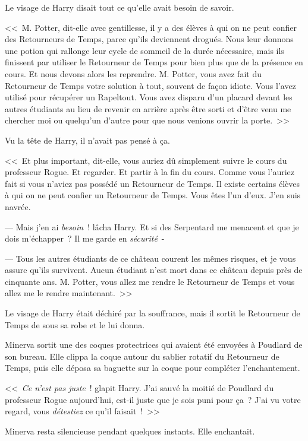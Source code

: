 Le visage de Harry disait tout ce qu'elle avait besoin de savoir.

<<~M. Potter, dit-elle avec gentillesse, il y a des élèves à qui on ne peut confier des Retourneurs de Temps, parce qu'ils deviennent drogués. Nous leur donnons une potion qui rallonge leur cycle de sommeil de la durée nécessaire, mais ils finissent par utiliser le Retourneur de Temps pour bien plus que de la présence en cours. Et nous devons alors les reprendre. M. Potter, vous avez fait du Retourneur de Temps votre solution à tout, souvent de façon idiote. Vous l'avez utilisé pour récupérer un Rapeltout. Vous avez disparu d'un placard devant les autres étudiants au lieu de revenir en arrière après être sorti et d'être venu me chercher moi ou quelqu'un d'autre pour que nous venions ouvrir la porte.~>>

Vu la tête de Harry, il n'avait pas pensé à ça.

<<~Et plus important, dit-elle, vous auriez dû simplement suivre le cours du professeur Rogue. Et regarder. Et partir à la fin du cours. Comme vous l'auriez fait si vous n'aviez pas possédé un Retourneur de Temps. Il existe certains élèves à qui on ne peut confier un Retourneur de Temps. Vous êtes l'un d'eux. J'en suis navrée.

--- Mais j'en ai \emph{besoin}~! lâcha Harry. Et si des Serpentard me menacent et que je dois m'échapper~? Il me garde en \emph{sécurité}~-

--- Tous les autres étudiants de ce château courent les mêmes risques, et je vous assure qu'ils survivent. Aucun étudiant n'est mort dans ce château depuis près de cinquante ans. M. Potter, vous allez me rendre le Retourneur de Temps et vous allez me le rendre maintenant.~>>

Le visage de Harry était déchiré par la souffrance, mais il sortit le Retourneur de Temps de sous sa robe et le lui donna.

Minerva sortit une des coques protectrices qui avaient été envoyées à Poudlard de son bureau. Elle clippa la coque autour du sablier rotatif du Retourneur de Temps, puis elle déposa sa baguette sur la coque pour compléter l'enchantement.

<<~\emph{Ce n'est pas juste}~! glapit Harry. J'ai sauvé la moitié de Poudlard du professeur Rogue aujourd'hui, est-il juste que je sois puni pour ça~? J'ai vu votre regard, vous \emph{détestiez} ce qu'il faisait~!~>>

Minerva resta silencieuse pendant quelques instants. Elle enchantait.

